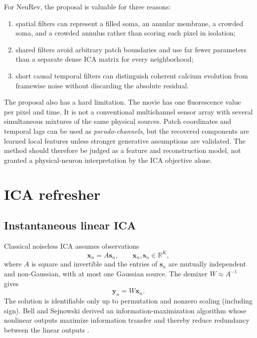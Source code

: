 \documentclass[11pt]{article}
\newcommand{\R}{\mathbb{R}}
\begin{document}
For NeuRev, the proposal is valuable for three reasons:
\begin{enumerate}[leftmargin=*]
\item spatial filters can represent a filled soma, an annular membrane, a
crowded soma, and a crowded annulus rather than scoring each pixel in isolation;
\item shared filters avoid arbitrary patch boundaries and use far fewer
parameters than a separate dense ICA matrix for every neighborhood;
\item short causal temporal filters can distinguish coherent calcium evolution
from framewise noise without discarding the absolute residual.
\end{enumerate}

The proposal also has a hard limitation. The movie has one fluorescence value
per pixel and time. It is not a conventional multichannel sensor array with
several simultaneous mixtures of the same physical sources. Patch coordinates
and temporal lags can be used as \emph{pseudo-channels}, but the recovered
components are learned local features unless stronger generative assumptions
are validated. The method should therefore be judged as a feature and
reconstruction model, not granted a physical-neuron interpretation by the ICA
objective alone.

\section{ICA refresher}

\subsection{Instantaneous linear ICA}

Classical noiseless ICA assumes observations
\begin{equation}
\bm x_n=A\bm s_n,\qquad
\bm x_n,\bm s_n\in\R^K,
\label{eq:ica-model}
\end{equation}
where $A$ is square and invertible and the entries of $\bm s_n$ are mutually
independent and non-Gaussian, with at most one Gaussian source. The demixer
$W\approx A^{-1}$ gives
\begin{equation}
\bm y_n=W\bm x_n.
\end{equation}
The solution is identifiable only up to permutation and nonzero scaling
(including sign). Bell and Sejnowski derived an information-maximization
algorithm whose nonlinear outputs maximize information transfer and thereby
reduce redundancy between the linear outputs \cite{bell1995infomax}.
\end{document}
